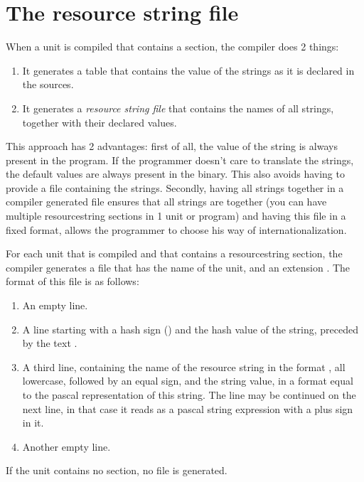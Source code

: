 \section{The resource string file}
When a unit is compiled that contains a  section,
the compiler does 2 things:
\begin{enumerate}
\item It generates a table that contains the value of the strings as it
is declared in the sources.
\item It generates a {\em resource string file} that contains the names
of all strings, together with their declared values.
\end{enumerate}
This approach has 2 advantages: first of all, the value of the string is
always present in the program. If the programmer doesn't care to translate
the strings, the default values are always present in the binary. This also
avoids having to provide a file containing the strings. Secondly, having all
strings together in a compiler generated file ensures that all strings are
together (you can have multiple resourcestring sections in 1 unit or program)
and having this file in a fixed format, allows the programmer to choose his
way of internationalization.

For each unit that is compiled and that contains a resourcestring section,
the compiler generates a file that has the name of the unit, and an
extension . The format of this file is as follows:
\begin{enumerate}
\item An empty line.
\item A line starting with a hash sign (\var{\#}) and the hash value of the
  string, preceded by the text .
\item A third line, containing the name of the resource string in the format
, all lowercase, followed by an equal sign, and
the string value, in a format equal to the pascal representation of this
string. The line may be continued on the next line, in that case it reads as
a pascal string expression with a plus sign in it.
\item Another empty line.
\end{enumerate}
If the unit contains no  section, no file is generated.

